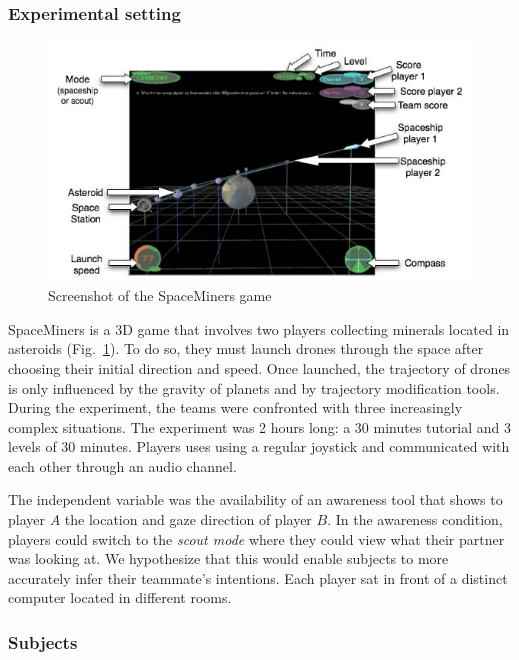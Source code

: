 \documentclass[natbib]{svjour3}
\begin{document}
\subsubsection*{Experimental setting}

\begin{figure}
        \centering
        \includegraphics[width=\textwidth]{image4.png}
        \caption{Screenshot of the {\sc SpaceMiners} game}
        \label{study1:spaceminer}
\end{figure}


{\sc SpaceMiners} is a 3D game that involves two players collecting minerals located
in asteroids (Fig.~\ref{study1:spaceminer}). To do so, they must launch drones through
the space after choosing their initial direction and speed. Once launched, the
trajectory of drones is only influenced by the gravity of planets and by
trajectory modification tools.  During the experiment, the teams were confronted
with three increasingly complex situations. The experiment was 2 hours long: a
30 minutes tutorial and 3 levels of 30 minutes. Players uses using a regular
joystick and communicated with each other through an audio channel.

The independent variable was the availability of an awareness tool that shows to
player $A$  the location and gaze direction of player $B$. In the awareness
condition, players could switch to the \emph{scout mode} where they could view what
their partner was looking at. We hypothesize that this would enable subjects to
more accurately infer their teammate's intentions. Each player sat in front of a
distinct computer located in different rooms. 

\subsubsection*{Subjects}
\end{document}
